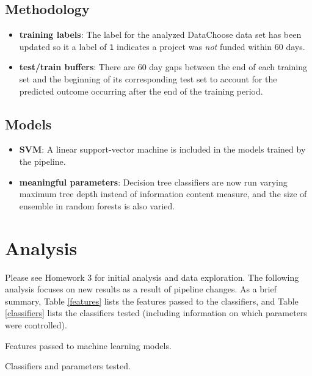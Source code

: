 \documentclass[11pt]{article}
\begin{document}
\subsection{Methodology}
\begin{itemize}
\item \textbf{training labels}: The label for the analyzed DataChoose data set has been updated so it a label of \texttt{1} indicates a project was \textit{not} funded within 60 days.
\item \textbf{test/train buffers}: There are 60 day gaps between the end of each training set and the beginning of its corresponding test set to account for the predicted outcome occurring after the end of the training period.
\end{itemize}

\subsection{Models}
\begin{itemize}
\item \textbf{SVM}: A linear support-vector machine is included in the models trained by the pipeline.
\item \textbf{meaningful parameters}: Decision tree classifiers are now run varying maximum tree depth instead of information content measure, and the size of ensemble in random forests is also varied. 
\end{itemize}

\pagebreak
\section{Analysis}
Please see Homework 3 for initial analysis and data exploration. The following analysis focuses on new results as a result of pipeline changes. As a brief summary, Table \ref{features} lists the features passed to the classifiers, and Table \ref{classifiers} lists the classifiers tested (including information on which parameters were controlled).

\begin{table}[H]
\centering \footnotesize  \renewcommand{\arraystretch}{1.1}

\caption{Features passed to machine learning models.}\label{features}
\end{table}

\begin{table}[H]
\centering \footnotesize  \renewcommand{\arraystretch}{1.1}

\caption{Classifiers and parameters tested.}\label{classifiers}
\end{table}
\end{document}
